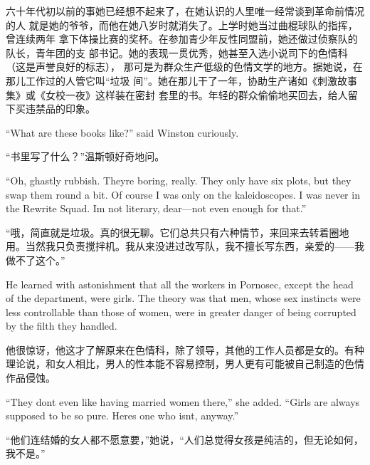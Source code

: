 \begin{paracol}{2}
\switchcolumn

六十年代初以前的事她已经想不起来了，在她认识的人里唯一经常谈到革命前情况的人
就是她的爷爷，而他在她八岁时就消失了。上学时她当过曲棍球队的指挥，曾连续两年
拿下体操比赛的奖杯。在参加青少年反性同盟前，她还做过侦察队的队长，青年团的支
部书记。她的表现一贯优秀，她甚至入选小说司下的色情科（这是声誉良好的标志），
那可是为群众生产低级的色情文学的地方。据她说，在那儿工作过的人管它叫``垃圾
间''。她在那儿干了一年，协助生产诸如《刺激故事集》或《女校一夜》这样装在密封
套里的书。年轻的群众偷偷地买回去，给人留下买违禁品的印象。

\switchcolumn*

``What are these books like?'' said Winston curiously.

\switchcolumn

``书里写了什么？''温斯顿好奇地问。

\switchcolumn*

``Oh, ghastly rubbish. They\textquotesingle re boring, really. They only
have six plots, but they swap them round a bit. Of course I was only on
the kaleidoscopes. I was never in the Rewrite Squad. I\textquotesingle m
not literary, dear---not even enough for that.''

\switchcolumn

``哦，简直就是垃圾。真的很无聊。它们总共只有六种情节，来回来去转着圈地用。当然我只负责搅拌机。我从来没进过改写队，我不擅长写东西，亲爱的——我做不了这个。''

\switchcolumn*

He learned with astonishment that all the workers in Pornosec, except
the head of the department, were girls. The theory was that men, whose
sex instincts were less controllable than those of women, were in
greater danger of being corrupted by the filth they handled.

\switchcolumn

他很惊讶，他这才了解原来在色情科，除了领导，其他的工作人员都是女的。有种理论说，和女人相比，男人的性本能不容易控制，男人更有可能被自己制造的色情作品侵蚀。

\switchcolumn*

``They don\textquotesingle t even like having married women there,'' she
added. ``Girls are always supposed to be so pure. Here\textquotesingle s
one who isn\textquotesingle t, anyway.''

\switchcolumn

``他们连结婚的女人都不愿意要，''她说，``人们总觉得女孩是纯洁的，但无论如何，我不是。''

\switchcolumn*


\end{paracol}
